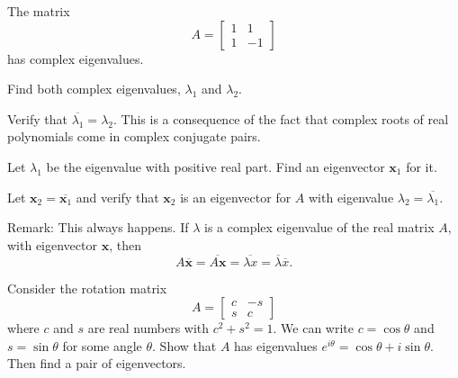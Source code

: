 \documentclass[minion]{homework}
\newcommand{\vx}{\mathbf{x}}
\begin{document}
\begin{aproblems}
\aproblem
The matrix
\[
A= \begin{bmatrix} 1 & 1 \\ 1 & -1 \end{bmatrix}
\]
has complex eigenvalues.
\begin{subproblems}
\item Find both complex eigenvalues, $\lambda_1$ and $\lambda_2$.
\item Verify that $\overline{\lambda_1}=\lambda_2$.  This 
is a consequence of the fact that complex roots of real polynomials come in complex conjugate pairs.  
\item Let $\lambda_1$ be the eigenvalue with positive real part.  Find
an eigenvector $\vx_1$ for it.
\item Let $\vx_2=\overline{\vx_1}$ and verify that $\vx_2$ is an eigenvector 
for $A$ with eigenvalue $\lambda_2=\overline{\lambda_1}$.

Remark: This always happens.  If $\lambda$ is a complex eigenvalue of the real matrix $A$, with eigenvector $\vx$, then 
\[
A\overline{\vx} = \overline{A\vx} = \overline{\lambda x} = \overline{\lambda} \overline{x}.
\]
\end{subproblems}

\aproblem Consider the rotation matrix
\[
A= \begin{bmatrix} c & -s \\ s & c \end{bmatrix}
\]
where $c$ and $s$ are real numbers with $c^2+s^2=1$.  We
can write $c=\cos\theta$ and $s=\sin\theta$ for some angle $\theta$.
Show that $A$ has eigenvalues $e^{i\theta}=\cos\theta+i\sin\theta$.
Then find a pair of eigenvectors.
\end{aproblems}
\end{document}
